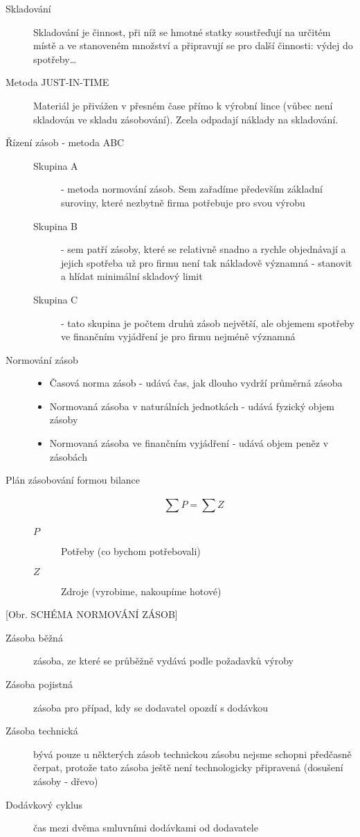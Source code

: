 \documentclass[11pt,a4paper,twoside]{book}
\begin{document}
	\begin{description}
		\item[Skladování] Skladování je činnost, při níž se hmotné statky soustřeďují na určitém místě a ve stanoveném množství a připravují se pro další činnosti: výdej do spotřeby\ldots
		\item[Metoda JUST-IN-TIME] Materiál je přivážen v přesném čase přímo k výrobní lince (vůbec není skladován ve skladu zásobování). Zcela odpadají náklady na skladování.
		\item[Řízení zásob - metoda ABC]
			\begin{description}
				\item[Skupina A] - metoda normování zásob. Sem zařadíme především základní suroviny, které nezbytně firma potřebuje pro svou výrobu
				\item[Skupina B] - sem patří zásoby, které se relativně snadno a rychle objednávají a jejich spotřeba už pro firmu není tak nákladově významná
				- stanovit a hlídat minimální skladový limit
				\item[Skupina C] - tato skupina je počtem druhů zásob největší, ale objemem spotřeby ve finančním vyjádření je pro firmu nejméně významná
			\end{description}
		\item[Normování zásob]
			\begin{itemize}
				\item Časová norma zásob - udává čas, jak dlouho vydrží průměrná zásoba
				\item Normovaná zásoba v naturálních jednotkách - udává fyzický objem zásoby
				\item Normovaná zásoba ve finančním vyjádření - udává objem peněz v zásobách
			\end{itemize}
		\item[Plán zásobování formou bilance]
			\begin{equation*}
				\sum_{}^{} P = \sum_{}^{} Z
			\end{equation*}
			\begin{description}
				\item[$P$] Potřeby (co bychom potřebovali)
				\item[$Z$] Zdroje (vyrobime, nakoupíme hotové)			
			\end{description}
	\end{description}

	[Obr. SCHÉMA NORMOVÁNÍ ZÁSOB]

	\begin{description}
		\item[Zásoba běžná] zásoba, ze které se průběžně vydává podle požadavků výroby
		\item[Zásoba pojistná] zásoba pro případ, kdy se dodavatel opozdí s dodávkou
		\item[Zásoba technická] bývá pouze u některých zásob technickou zásobu nejsme schopni předčasně čerpat, protože tato zásoba ještě není technologicky připravená (dosušení zásoby - dřevo)
		\item[Dodávkový cyklus] čas mezi dvěma smluvními dodávkami od dodavatele
	\end{description}
\end{document}
